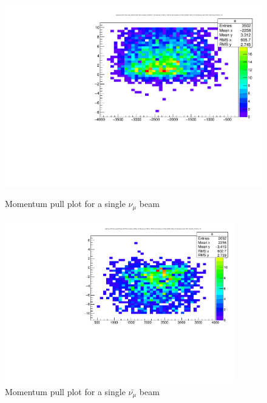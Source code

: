 \begin{figure}[h!]
	\begin{minipage}{0.49\linewidth}
		\centerline{\includegraphics[width=0.9\linewidth]{figures/muNeutrinoPull.pdf}}
			\caption[]{Momentum pull plot for a single $\nu_{\mu}$ beam}
		\label{fig:numumom}
	\end{minipage}
	\hfill
	\begin{minipage}{0.49\linewidth}
		\centerline{\includegraphics[width=0.9\textwidth]{figures/antimuNeutrinoPull.pdf}}
		\caption[]{Momentum pull plot for a single $\bar{\nu_{\mu}}$ beam}
		\label{fig:antinumumom}
	\end{minipage}
\end{figure}


